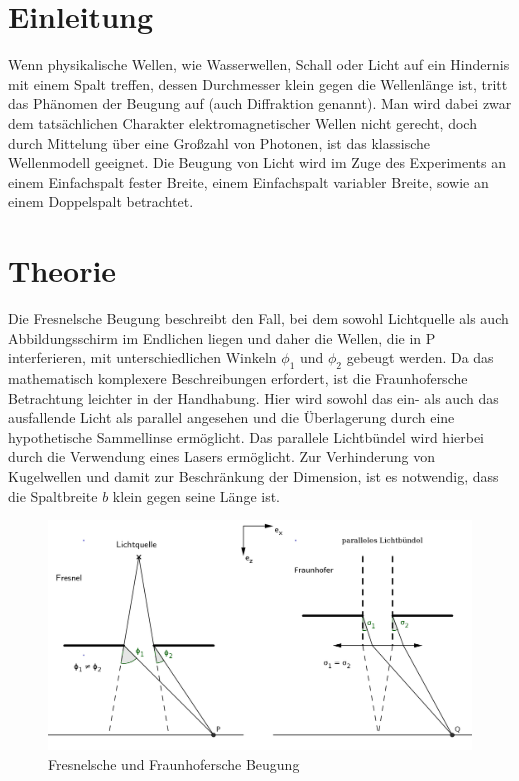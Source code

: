 
\section{Einleitung}				%
Wenn physikalische Wellen, wie Wasserwellen, Schall oder Licht auf ein Hindernis mit einem Spalt treffen, dessen Durchmesser 
klein gegen die Wellenlänge ist, tritt das Phänomen der Beugung auf (auch Diffraktion genannt). Man wird dabei zwar dem
tatsächlichen Charakter elektromagnetischer Wellen nicht gerecht, doch durch Mittelung über eine Großzahl von Photonen, ist
das klassische Wellenmodell geeignet. Die Beugung von Licht wird im Zuge des Experiments an einem Einfachspalt fester Breite, einem Einfachspalt variabler Breite, sowie an einem Doppelspalt
betrachtet.

\section{Theorie}
Die Fresnelsche Beugung beschreibt den Fall, bei dem sowohl Lichtquelle als auch Abbildungsschirm im Endlichen liegen und daher die Wellen,
die in P interferieren, mit unterschiedlichen Winkeln $\phi_1$ und $\phi_2$ gebeugt werden. Da das mathematisch komplexere
Beschreibungen erfordert, ist die Fraunhofersche Betrachtung leichter in der Handhabung. Hier wird sowohl das ein- als auch das ausfallende Licht als parallel angesehen und die Überlagerung durch eine hypothetische Sammellinse ermöglicht. Das parallele Lichtbündel wird
hierbei durch die Verwendung eines Lasers ermöglicht. Zur Verhinderung von Kugelwellen und damit zur Beschränkung der
Dimension, ist es notwendig, dass die Spaltbreite $b$ klein gegen seine Länge ist.


\begin{figure}[htbp]
\includegraphics[width=1\textwidth]{pics/406_1.png}
\centering
\caption {Fresnelsche und Fraunhofersche Beugung}
\end{figure}


